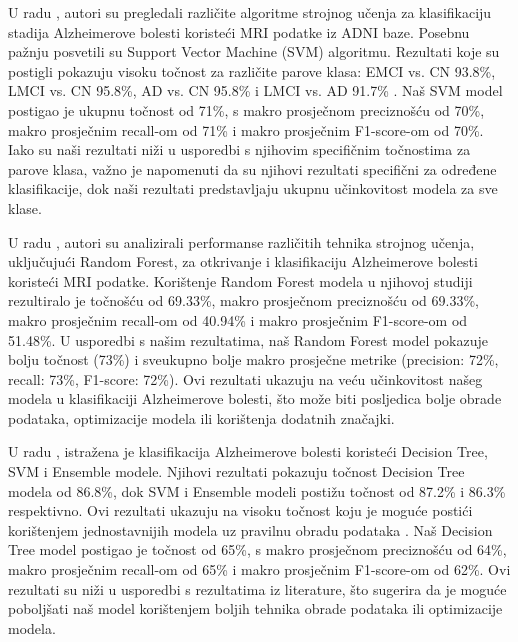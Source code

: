 \documentclass[zavrsnirad]{fer}
\begin{document}
U radu \cite{IRJET}, autori su pregledali različite algoritme strojnog učenja za klasifikaciju stadija Alzheimerove bolesti koristeći MRI podatke iz ADNI baze. Posebnu pažnju posvetili su Support Vector Machine (SVM) algoritmu. Rezultati koje su postigli pokazuju visoku točnost za različite parove klasa: EMCI vs. CN 93.8\%, LMCI vs. CN 95.8\%, AD vs. CN 95.8\% i LMCI vs. AD 91.7\% .
Naš SVM model postigao je ukupnu točnost od 71\%, s makro prosječnom preciznošću od 70\%, makro prosječnim recall-om od 71\% i makro prosječnim F1-score-om od 70\%. Iako su naši rezultati niži u usporedbi s njihovim specifičnim točnostima za parove klasa, važno je napomenuti da su njihovi rezultati specifični za određene klasifikacije, dok naši rezultati predstavljaju ukupnu učinkovitost modela za sve klase.


U radu \cite{AnalysisPerformance}, autori su analizirali performanse različitih tehnika strojnog učenja, uključujući Random Forest, za otkrivanje i klasifikaciju Alzheimerove bolesti koristeći MRI podatke. Korištenje Random Forest modela u njihovoj studiji rezultiralo je točnošću od 69.33\%, makro prosječnom preciznošću od 69.33\%, makro prosječnim recall-om od 40.94\% i makro prosječnim F1-score-om od 51.48\%.
U usporedbi s našim rezultatima, naš Random Forest model pokazuje bolju točnost (73\%) i sveukupno bolje makro prosječne metrike (precision: 72\%, recall: 73\%, F1-score: 72\%). Ovi rezultati ukazuju na veću učinkovitost našeg modela u klasifikaciji Alzheimerove bolesti, što može biti posljedica bolje obrade podataka, optimizacije modela ili korištenja dodatnih značajki.



U radu \cite{asi}, istražena je klasifikacija Alzheimerove bolesti koristeći Decision Tree, SVM i Ensemble modele. Njihovi rezultati pokazuju točnost Decision Tree modela od 86.8\%, dok SVM i Ensemble modeli postižu točnost od 87.2\% i 86.3\% respektivno. Ovi rezultati ukazuju na visoku točnost koju je moguće postići korištenjem jednostavnijih modela uz pravilnu obradu podataka .
Naš Decision Tree model postigao je točnost od 65\%, s makro prosječnom preciznošću od 64\%, makro prosječnim recall-om od 65\% i makro prosječnim F1-score-om od 62\%. Ovi rezultati su niži u usporedbi s rezultatima iz literature, što sugerira da je moguće poboljšati naš model korištenjem boljih tehnika obrade podataka ili optimizacije modela.



\end{document}
